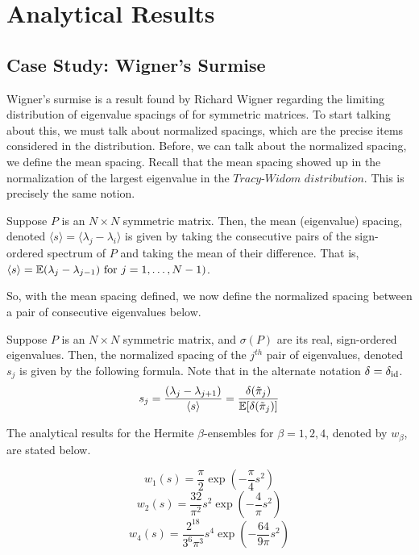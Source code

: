 \section{Analytical Results}


\subsection{Case Study: Wigner's Surmise}

Wigner's surmise is a result found by Richard Wigner regarding the limiting distribution of eigenvalue spacings of for symmetric matrices. To start talking about this, we must talk about normalized spacings, which are the precise items considered in the distribution. Before, we can talk about the normalized spacing, we define the mean spacing. Recall that the mean spacing showed up in the normalization of the largest eigenvalue in the $\textit{Tracy-Widom distribution}$. This is precisely the same notion.

\begin{definition}
Suppose $P$ is an $N \times N$ symmetric matrix. Then, the mean (eigenvalue) spacing, denoted $\langle s \rangle = \langle \lambda_j - \lambda_i \rangle$ is given by taking the consecutive pairs of the sign-ordered spectrum of $P$ and taking the mean of their difference. That is, $\langle s \rangle = \mathbb{E}(\lambda_j - \lambda_{j-1}) \text{ for } j = 1,\dots,N-1)$.
\end{definition}

So, with the mean spacing defined, we now define the normalized spacing between a pair of consecutive eigenvalues below.

\begin{definition}
Suppose $P$ is an $N \times N$ symmetric matrix, and $\sigma(P)$ are its real, sign-ordered eigenvalues. Then, the normalized spacing of the $j^{th}$ pair of eigenvalues, denoted $s_j$ is given by the following formula. Note that in the alternate notation $\delta = \delta_{\text{id}}$.
$$s_j = \frac{(\lambda_j - \lambda_{j+1})}{\langle s \rangle} = \frac{\delta({\tilde{\pi}}_{j})}{\mathbb{E}[\delta({\tilde{\pi}}_{j})]}$$
\end{definition}

The analytical results for the Hermite $\beta$-ensembles for $\beta = 1, 2, 4$, denoted by $w_\beta$, are stated below.

$$w_1(s) = \frac{\pi}{2} \exp(-\frac{\pi}{4}s^2)$$
$$w_2(s) = \frac{32}{\pi^2} s^2 \exp(-\frac{4}{\pi}s^2)$$
$$w_4(s) = \frac{2^{18}}{3^{6}\pi^3} s^4 \exp(-\frac{64}{9\pi}s^2)$$

